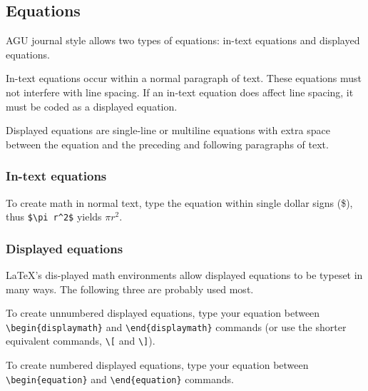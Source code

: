 \begin{article}
\subsection{Equations}

AGU journal style allows two types of equations: 
in-text equations and displayed equations.

In-text equations occur within a normal paragraph of
text.  These equations must not interfere with line
spacing.  If an in-text equation does affect line
spacing, it must be coded as a displayed equation.

Displayed equations are single-line or multiline
equations with extra space between the equation
and the preceding and following paragraphs of text.


\subsubsection{In-text equations}

To create math in normal text, type the 
equation within single dollar signs (\$), 
thus \verb"$\pi r^2$" yields $\pi r^2$.


\subsubsection{Displayed equations}

\LaTeX's dis-\linebreak played math environments 
allow displayed equations to be typeset in many 
ways.  The following three are probably used most.



To create unnumbered displayed equations, type your
equation between \verb"\begin{displaymath}" and  \linebreak
\verb"\end{displaymath}" commands (or use the 
shorter equivalent commands, \verb"\[" and \verb"\]").



To create numbered displayed equations, type your
equation between \verb"\begin{equation}" and \linebreak
\verb"\end{equation}" commands.




\end{article}
